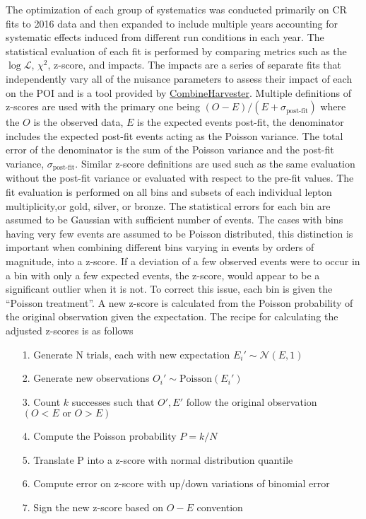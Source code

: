The optimization of each group of systematics was conducted primarily on CR fits to 2016 data and then expanded to include multiple years accounting for systematic effects induced from different run conditions in each year. The statistical evaluation of each fit is performed by comparing metrics such as the $\log\mathcal{L}$, $\chi^2$, z-score, and impacts. The impacts are a series of separate fits that independently vary all of the nuisance parameters to assess their impact of each on the POI and is a tool provided by \url{CombineHarvester}. Multiple definitions of z-scores are used with the primary one being $ (O-E)/(E+\sigma_{\text{post-fit}})$ where the $O$ is the observed data, $E$ is the expected events post-fit, the denominator includes the expected post-fit events acting as the Poisson variance. The total error of the denominator is the sum of the Poisson variance and the post-fit variance, $\sigma_{\text{post-fit}}$. Similar z-score definitions are used such as the same evaluation without the post-fit variance or evaluated with respect to the pre-fit values. The fit evaluation is performed on all bins and subsets of each individual lepton multiplicity,or gold, silver, or bronze. The statistical errors for each bin are assumed to be Gaussian with sufficient number of events. The cases with bins having very few events are assumed to be Poisson distributed, this distinction is important when combining different bins varying in events by orders of magnitude, into a z-score. If a deviation of a few observed events were to occur in a bin with only a few expected events, the z-score, would appear to be a significant outlier when it is not. To correct this issue, each bin is given the ``Poisson treatment''. A new z-score is calculated from the Poisson probability of the original observation given the expectation. The recipe for calculating the adjusted z-scores is as follows
\begin{itemize}
\item[1.] Generate N trials, each with new expectation $E_i' \sim \mathcal{N}(E,1)$
\item[2.] Generate new observations $O_i'\sim \text{Poisson}(E_i')$
\item[3.] Count $k$ successes such that $O',E'$ follow the original observation $(O<E \,\, \text{or} \, \, O>E)$
\item[4.] Compute the Poisson probability $P=k/N$ 
\item[5.] Translate P into a z-score with normal distribution quantile
\item[6.] Compute error on z-score with up/down variations of binomial error
\item[7.] Sign the new z-score based on $O-E$ convention
\end{itemize} 

